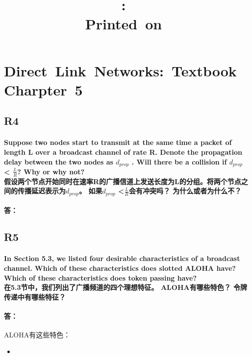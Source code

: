 \documentclass[a4paper]{ctexart}
\title{
    \vspace{2in}
    \textmd{\textbf{\hmwkClass:\ \hmwkTitle}}\\
    \normalsize\vspace{0.1in}\small{Printed\ on\ \hmwkDueDate}\\
    \vspace{0.1in}\large{\textit{\hmwkClassInstructor}}
    \vspace{3in}
}
\author{\hmwkAuthorName}
\date{}
\begin{document}
\maketitle

\pagebreak

\section*{Direct\ Link\ Networks:\ Textbook\ Charpter\ 5}

\subsection*{R4}
\paragraph*{Suppose two nodes start to transmit at the same time a packet of length L over a broadcast channel of rate R. Denote the propagation delay between the two nodes as $d_{prop}$ . Will there be a collision if $d_{prop}$ < $\frac{L}{R}$? Why or why not? \\
假设两个节点开始同时在速率R的广播信道上发送长度为L的分组。将两个节点之间的传播延迟表示为$d_{prop}$。 如果$d_{prop}$ <$\frac{L}{R}$会有冲突吗？ 为什么或者为什么不？
}
\paragraph*{答：} 

\subsection*{R5}
\paragraph*{In Section 5.3, we listed four desirable characteristics of a broadcast channel. Which of these characteristics does slotted ALOHA have? Which of these characteristics does token passing have?\\
在5.3节中，我们列出了广播频道的四个理想特征。 ALOHA有哪些特色？ 令牌传递中有哪些特征？
}
\paragraph*{答：}  
ALOHA有这些特色：\\
\begin{itemize}
    \item 
\end{itemize}
\end{document}
